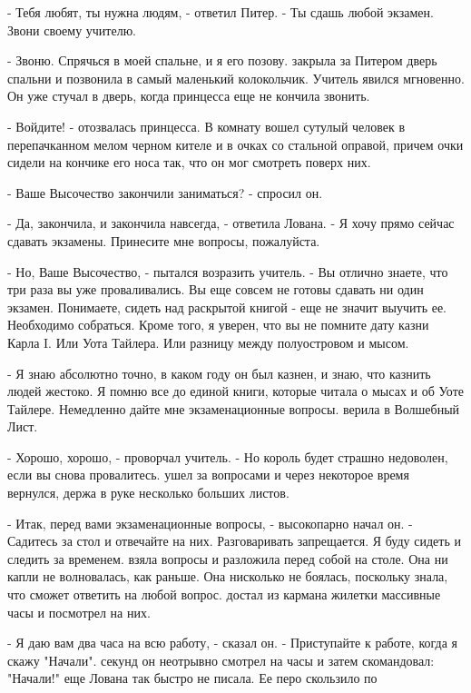\par- Тебя любят, ты нужна людям, - ответил Питер. - Ты сдашь любой 
экзамен. Звони своему учителю.
\par- Звоню. Спрячься в моей спальне, и я его позову.
 закрыла за Питером дверь спальни и позвонила в самый маленький 
колокольчик. Учитель явился мгновенно. Он уже стучал в дверь, когда 
принцесса еще не кончила звонить.
\par- Войдите! - отозвалась принцесса. В комнату вошел сутулый человек 
в перепачканном мелом черном кителе и в очках со стальной оправой, 
причем очки сидели на кончике его носа так, что он мог смотреть поверх 
них.
\par- Ваше Высочество закончили заниматься? - спросил он.
\par- Да, закончила, и закончила навсегда, - ответила Лована. - Я хочу 
прямо сейчас сдавать экзамены. Принесите мне вопросы, пожалуйста.
\par- Но, Ваше Высочество, - пытался возразить учитель. - Вы отлично 
знаете, что три раза вы уже проваливались. Вы еще совсем не готовы 
сдавать ни один экзамен. Понимаете, сидеть над раскрытой книгой - еще 
не значит выучить ее. Необходимо собраться. Кроме того, я уверен, что 
вы не помните дату казни Карла I. Или Уота Тайлера. Или разницу между 
полуостровом и мысом.
\par- Я знаю абсолютно точно, в каком году он был казнен, и знаю, что 
казнить людей жестоко. Я помню все до единой книги, которые читала о 
мысах и об Уоте Тайлере. Немедленно дайте мне экзаменационные вопросы.
 верила в Волшебный Лист.
\par- Хорошо, хорошо, - проворчал учитель. - Но король будет страшно 
недоволен, если вы снова провалитесь.
 ушел за вопросами и через некоторое время вернулся, держа в 
руке несколько больших листов.
\par- Итак, перед вами экзаменационные вопросы, - высокопарно начал 
он. - Садитесь за стол и отвечайте на них. Разговаривать запрещается. 
Я буду сидеть и следить за временем.
 взяла вопросы и разложила перед собой на столе. Она ни 
капли не волновалась, как раньше. Она нисколько не боялась, поскольку 
знала, что сможет ответить на любой вопрос.
 достал из кармана жилетки массивные часы и посмотрел на 
них.
\par- Я даю вам два часа на всю работу, - сказал он. - Приступайте к 
работе, когда я скажу "Начали".
 секунд он неотрывно смотрел на часы и затем скомандовал: 
"Начали!"
 еще Лована так быстро не писала. Ее перо скользило по 
